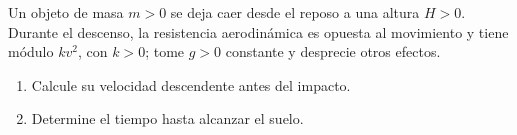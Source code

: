 Un objeto de masa $m>0$ se deja caer desde el reposo a una altura $H>0$. Durante el descenso, la resistencia aerodinámica es opuesta al movimiento y tiene módulo $kv^2$, con $k>0$; tome $g>0$ constante y desprecie otros efectos.

\begin{enumerate}[label=(\alph*),ref=\alph*,leftmargin=*]
\item Calcule su velocidad descendente antes del impacto.
\item Determine el tiempo hasta alcanzar el suelo.
\end{enumerate}
